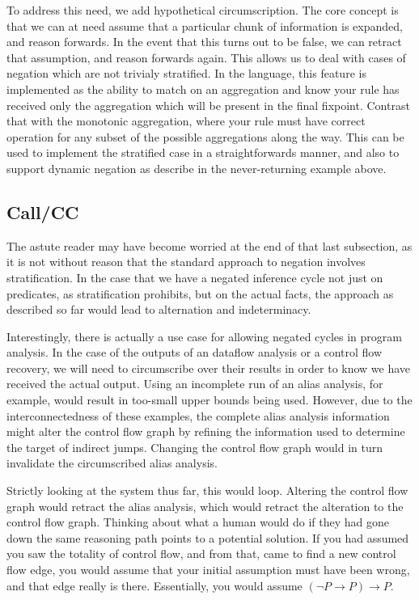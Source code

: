 To address this need, we add hypothetical circumscription.
The core concept is that we can at need assume that a particular chunk of information is expanded, and reason forwards.
In the event that this turns out to be false, we can retract that assumption, and reason forwards again.
This allows us to deal with cases of negation which are not trivialy stratified.
In the language, this feature is implemented as the ability to match on an aggregation and know your rule has received only the aggregation which will be present in the final fixpoint.
Contrast that with the monotonic aggregation, where your rule must have correct operation for any subset of the possible aggregations along the way.
This can be used to implement the stratified case in a straightforwards manner, and also to support dynamic negation as describe in the never-returning example above.

\subsection{Call/CC}
\label{sec:motive-callcc}
The astute reader may have become worried at the end of that last subsection, as it is not without reason that the standard approach to negation involves stratification.
In the case that we have a negated inference cycle not just on predicates, as stratification prohibits, but on the actual facts, the approach as described so far would lead to alternation and indeterminacy.

Interestingly, there is actually a use case for allowing negated cycles in program analysis.
In the case of the outputs of an dataflow analysis or a control flow recovery, we will need to circumscribe over their results in order to know we have received the actual output.
Using an incomplete run of an alias analysis, for example, would result in too-small upper bounds being used.
However, due to the interconnectedness of these examples, the complete alias analysis information might alter the control flow graph by refining the information used to determine the target of indirect jumps.
Changing the control flow graph would in turn invalidate the circumscribed alias analysis.

Strictly looking at the system thus far, this would loop.
Altering the control flow graph would retract the alias analysis, which would retract the alteration to the control flow graph.
Thinking about what a human would do if they had gone down the same reasoning path points to a potential solution.
If you had assumed you saw the totality of control flow, and from that, came to find a new control flow edge, you would assume that your initial assumption must have been wrong, and that edge really is there.
Essentially, you would assume $(\neg P \rightarrow P) \rightarrow P$.

